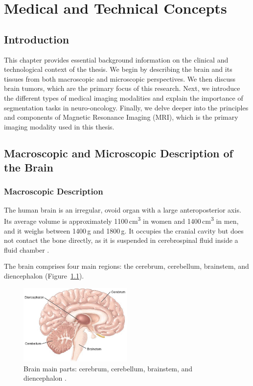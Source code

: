 \chapter{Medical and Technical Concepts}

\section{Introduction}
This chapter provides essential background information on the clinical and technological context of the thesis. We begin by describing the brain and its tissues from both macroscopic and microscopic perspectives. We then discuss brain tumors, which are the primary focus of this research. Next, we introduce the different types of medical imaging modalities and explain the importance of segmentation tasks in neuro-oncology. Finally, we delve deeper into the principles and components of Magnetic Resonance Imaging (MRI), which is the primary imaging modality used in this thesis.

\section{Macroscopic and Microscopic Description of the Brain}

\subsection{Macroscopic Description}
The human brain is an irregular, ovoid organ with a large anteroposterior axis. Its average volume is approximately 1100\,cm\textsuperscript{3} in women and 1400\,cm\textsuperscript{3} in men, and it weighs between 1400\,g and 1800\,g. It occupies the cranial cavity but does not contact the bone directly, as it is suspended in cerebrospinal fluid inside a fluid chamber \cite{ref3}.

The brain comprises four main regions: the cerebrum, cerebellum, brainstem, and diencephalon (Figure~\ref{fig:brain-regions}).

\begin{figure}[ht]
  \centering
  \includegraphics[width=0.5\textwidth]{Images/Chapter0/brain.jpg}
  \caption{Brain main parts: cerebrum, cerebellum, brainstem, and diencephalon \cite{freudenrich2013visualizing}.}
  \label{fig:brain-regions}
\end{figure}

